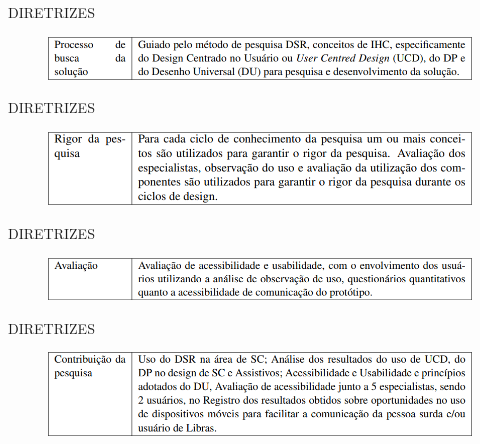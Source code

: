 \documentclass{Alexandre}
\begin{document}
\begin{frame}{DIRETRIZES}
    
    \begin{figure}
        \includegraphics[scale = 0.5]{Figuras/DSR-3.png}
    \end{figure}

\end{frame}


\begin{frame}{DIRETRIZES}
    
    \begin{figure}
        \includegraphics[scale = 0.5]{Figuras/DSR-4.png}
    \end{figure}

\end{frame}


\begin{frame}{DIRETRIZES}
    
    \begin{figure}
        \includegraphics[scale = 0.5]{Figuras/DSR-5.png}
    \end{figure}

\end{frame}


\begin{frame}{DIRETRIZES}
    
    \begin{figure}
        \includegraphics[scale = 0.5]{Figuras/DSR-6.png}
    \end{figure}

\end{frame}
\end{document}
